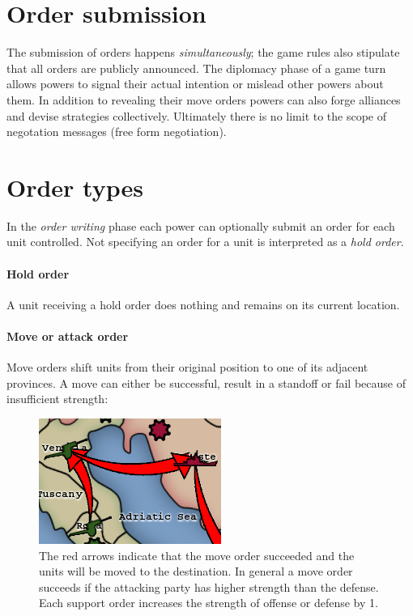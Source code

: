 \documentclass[pdftex,11pt,a4paper]{report}
\begin{document}
\section{Order submission}

The submission of orders happens \textit{simultaneously}; the game
rules also stipulate that all orders are publicly announced. The diplomacy
phase of a game turn allows powers to signal their actual intention or
mislead other powers about them. In addition to revealing their move
orders powers can also forge alliances and devise strategies
collectively. Ultimately there is no limit to the scope of negotation
messages (free form negotiation).

\section{Order types}

In the \textit{order writing} phase each power can optionally submit
an order for each unit controlled. Not specifying an order for a 
unit is interpreted as a \textit{hold order}. 

\paragraph{Hold order}
A unit receiving a hold order does nothing and remains on its 
current location. 

\paragraph{Move or attack order} 
Move orders shift units from their original position to one of its
adjacent provinces. A move can either be successful, result in a
standoff or fail because of insufficient strength: 

\begin{figure}
\includegraphics[scale=0.75]{./screenshots/Move0.png} \\[1cm] 

The red arrows indicate that the move order succeeded and the units
will be moved to the destination. In general a move order succeeds
if the attacking party has higher strength than the defense. Each 
support order increases the strength of offense or defense by 1.

\end{figure}
\end{document}
